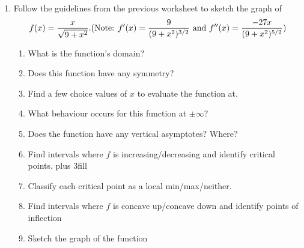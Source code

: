 \documentclass[11pt,fleqn]{article}
\begin{document}
\begin{enumerate}

\newpage
\item Follow the guidelines from the previous worksheet
 to sketch the graph of
\[
f(x)=\frac x{\sqrt{9+x^2}}.  \hfill (\text{Note: } f'(x)=\frac{9}{(9+x^2)^{3/2}} \text{  and } f''(x)=\frac{-27x}{(9+x^2)^{5/2}})
\]
\begin{enumerate}
\item What is the function's domain?
\vfill
\item Does this function have any symmetry?
\vfill
\item Find a few choice values of $x$ to evaluate the function at.
\vfill
\item What behaviour occurs for this function at $\pm \infty$?
\vfill
\item Does the function have any vertical asymptotes?  Where?
\vfill
\item Find intervals where $f$ is increasing/decreasing and 
identify critical points.
\vskip 0pt plus 3fill
\newpage
\item Classify each critical point as a local min/max/neither.
\vskip 1in
\item Find intervals where $f$ is concave up/concave down and identify
points of inflection
\vfill
\item Sketch the graph of the function
\vfill
\end{enumerate}
\end{enumerate}
\end{document}
